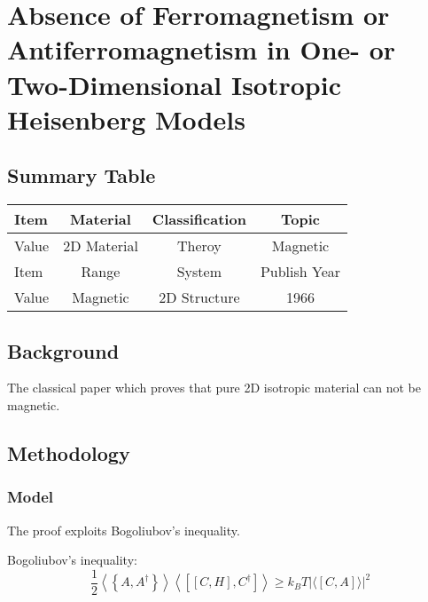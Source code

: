 \setchapterpreamble[u]{\margintoc}
\chapter{Absence of Ferromagnetism or Antiferromagnetism in One- or Two-Dimensional Isotropic Heisenberg Models\cite{PhysRevLett.17.1133}}

\section{Summary Table}

\begin{table}[h]
    \begin{tabular}{lccc}
    \hline
    Item  & Material         & Classification & Topic        \\  \hline
    Value & 2D Material      & Theroy         & Magnetic     \\  \hline
    Item  & Range            & System         & Publish Year \\  \hline
    Value & Magnetic         & 2D Structure   & 1966         \\  \hline
    \end{tabular}
\end{table}

\section{Background}
The classical paper which proves that pure 2D isotropic material can not be magnetic.

\section{Methodology}


\subsection{Model}
The proof exploits Bogoliubov's inequality.
\begin{theorem}
    Bogoliubov's inequality: \\
    \begin{equation}
        \frac{1}{2} \left\langle \left\{ A, A^{\dagger} \right\} \right\rangle \left\langle \left[ \left[ C, H \right], C^{\dagger} \right] \right\rangle 
        \ge k_B T \left|\langle\left[ C, A \right]\rangle\right|^2
    \end{equation}
\end{theorem}

